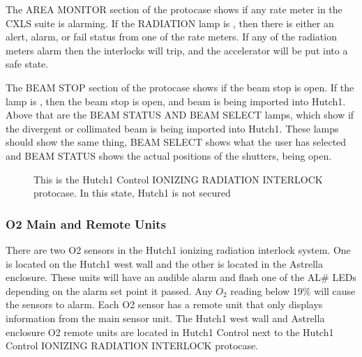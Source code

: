 \documentclass[letterpaper,10pt,english]{sphinxmanual}
\begin{document}
\sphinxAtStartPar
The AREA MONITOR section of the protocase shows if any rate meter in the CXLS suite is alarming.
If the RADIATION lamp is , then there is either an alert, alarm, or fail status from one of the rate meters.
If any of the radiation meters alarm then the interlocks will trip, and the accelerator will be put into a safe state.

\sphinxAtStartPar
The BEAM STOP section of the protocase shows if the beam stop is open.
If the lamp is , then the beam stop is open, and beam is being imported into Hutch\sphinxhyphen{}1.
Above that are the BEAM STATUS AND BEAM SELECT lamps, which show if the divergent or collimated beam is being imported into Hutch\sphinxhyphen{}1.
These lamps should show the same thing, BEAM SELECT shows what the user has selected and BEAM STATUS shows the actual positions of the shutters,  being open.

\begin{figure}[htbp]
\centering
\capstart

\noindent{}
\caption{ This is the Hutch\sphinxhyphen{}1 Control IONIZING RADIATION INTERLOCK protocase. In this state, Hutch\sphinxhyphen{}1 is not secured}\label{\detokenize{user_documentation/Hutch-1_ionizing_radiation:id1}}\end{figure}


\subsubsection{O2 Main and Remote Units}
\label{\detokenize{user_documentation/Hutch-1_ionizing_radiation:o2-main-and-remote-units}}
\sphinxAtStartPar
There are two O2 sensors in the Hutch\sphinxhyphen{}1 ionizing radiation interlock system.
One is located on the Hutch\sphinxhyphen{}1 west wall and the other is located in the Astrella enclosure.
These units will have an audible alarm and flash one of the AL\# LEDs depending on the alarm set point it passed.
Any \(O_{2}\) reading below 19\% will cause the sensors to alarm.
Each O2 sensor has a remote unit that only displays information from the main sensor unit.
The Hutch\sphinxhyphen{}1 west wall and Astrella enclosure O2 remote units are located in Hutch\sphinxhyphen{}1 Control next to the Hutch\sphinxhyphen{}1 Control IONIZING RADIATION INTERLOCK protocase.
\end{document}
